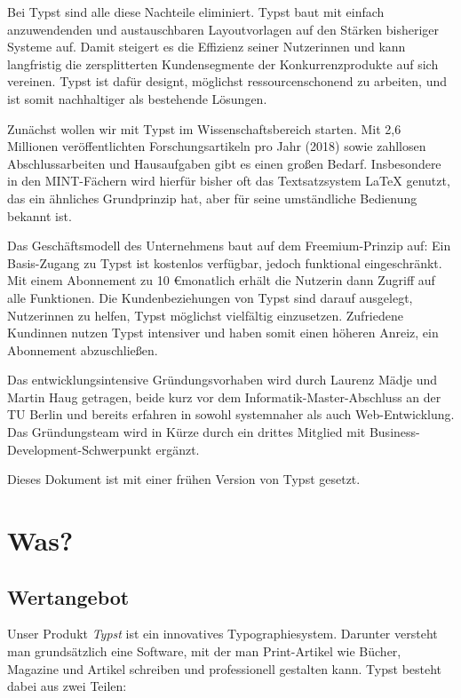 \documentclass[11pt, a4paper]{article}
\newcommand{\gender}{\raisebox{-.25em}{*}}
\let\oldsection\section
\renewcommand\section{\clearpage\oldsection}
\newcommand{\cited}[1]{\marginsymbol{$\nearrow$ #1}}
\newcommand{\marginsymbol}[1] {\protect\marginsymbolhelper{#1}}
\newcommand{\marginsymbolhelper}[1] {\tabto*{-1cm}\makebox[0cm]{#1}\tabto*{\TabPrevPos}}
\begin{document}
Bei Typst sind alle diese Nachteile eliminiert. Typst baut mit einfach anzuwendenden und austauschbaren Layoutvorlagen auf den Stärken bisheriger Systeme auf. Damit steigert es die Effizienz seiner Nutzer\gender{}innen und kann langfristig die zersplitterten Kundensegmente der Konkurrenzprodukte auf sich vereinen. Typst ist dafür designt, möglichst ressourcenschonend zu arbeiten, und ist somit nachhaltiger als bestehende Lösungen.

Zunächst wollen wir mit Typst im Wissenschaftsbereich starten. Mit \cited{1} 2,6 Millionen veröffentlichten Forschungsartikeln pro Jahr (2018) sowie zahllosen Abschlussarbeiten und Hausaufgaben gibt es einen großen Bedarf. Insbesondere in den MINT-Fächern wird hierfür bisher oft das Textsatzsystem LaTeX genutzt, das ein ähnliches Grundprinzip hat, aber für seine umständliche Bedienung bekannt ist.

Das Geschäftsmodell des Unternehmens baut auf dem Freemium-Prinzip auf: Ein Basis-Zugang zu Typst ist kostenlos verfügbar, jedoch funktional eingeschränkt. Mit einem Abonnement zu 10 \euro monatlich erhält die\gender{} Nutzer\gender{}in dann Zugriff auf alle Funktionen. Die Kundenbeziehungen von Typst sind darauf ausgelegt, Nutzer\gender{}innen zu helfen, Typst möglichst vielfältig einzusetzen. Zufriedene Kund\gender{}innen nutzen Typst intensiver und haben somit einen höheren Anreiz, ein Abonnement abzuschließen.

Das entwicklungsintensive Gründungsvorhaben wird durch Laurenz Mädje und Martin Haug getragen, beide kurz vor dem Informatik-Master-Abschluss an der TU Berlin und bereits erfahren in sowohl systemnaher als auch Web-Entwicklung. Das Gründungsteam wird in Kürze durch ein drittes Mitglied mit Business-Development-Schwerpunkt ergänzt.

Dieses Dokument ist mit einer frühen Version von Typst gesetzt.


\section*{Was?}
\subsection*{Wertangebot}

Unser Produkt \emph{Typst} ist ein innovatives Typographiesystem. Darunter versteht man grundsätzlich eine Software, mit der man Print-Artikel wie Bücher, Magazine und Artikel schreiben und professionell gestalten kann. Typst besteht dabei aus zwei Teilen:
\end{document}
